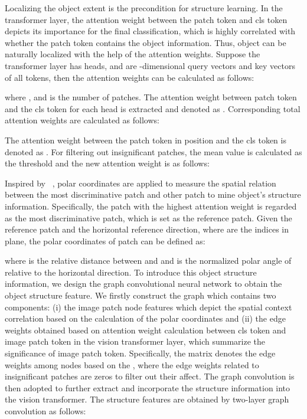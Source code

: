 \documentclass[sigconf, nonacm]{acmart}
\begin{document}
Localizing the object extent is the precondition for structure learning. In the transformer layer, the attention weight between the patch token and cls token depicts its importance for the final classification, which is highly correlated with whether the patch token contains the object information. Thus, object can be naturally localized with the help of the attention weights. Suppose the transformer layer has  heads,  and  are -dimensional query vectors and key vectors of all tokens, then the attention weights can be calculated as follows:

where ,  and  is the number of patches. The attention weight between patch token and the cls token for each head is extracted and denoted as . Corresponding total attention weights are calculated as follows:

The attention weight between the patch token in  position and the cls token is denoted as . For filtering out insignificant patches, the mean value  is calculated as the threshold and the new attention weight is as follows:





Inspired by ~\cite{zhou2020look}, polar coordinates are applied to measure the spatial relation between the most discriminative patch and other patch to mine object’s structure information. Specifically, the patch with the highest attention weight is regarded as the most discriminative patch, which is set as the reference patch. Given the reference patch  and the horizontal reference direction, where  are the indices in  plane, the polar coordinates of patch  can be defined as:


where  is the relative distance between  and  and  is the normalized polar angle of  relative to the horizontal direction. To introduce this object structure information, we design the graph convolutional neural network to obtain the object structure feature. We firstly construct the graph which contains two components: (i) the image patch node features  which depict the spatial context correlation based on the calculation of the polar coordinates and (ii) the edge weights obtained based on attention weight calculation between cls token and image patch token in the vision transformer layer, which summarize the significance of image patch token. Specifically, the matrix  denotes the edge weights among nodes based on the , where the edge weights related to insignificant patches are zeros to filter out their affect. The graph convolution is then adopted to further extract and incorporate the structure information into the vision transformer. The structure features  are obtained by two-layer graph convolution as follows:
\end{document}
